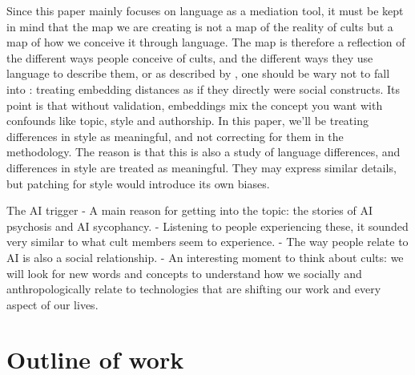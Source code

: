 Since this paper mainly focuses on language as a mediation tool, it must be kept in mind that the map we are creating is not a map of the reality of cults but a map of how we conceive it through language. The map is therefore a reflection of the different ways people conceive of cults, and the different ways they use language to describe them, or as described by \textcite{liProxyPresumptionSemantic2026}, one should be wary not to fall into : treating embedding distances as if they directly were social constructs. Its point is that without validation, embeddings mix the concept you want with confounds like topic, style and authorship. In this paper, we'll be treating differences in style as meaningful, and not correcting for them in the methodology. The reason is that this is also a study of language differences, and differences in style are treated as meaningful. They may express similar details, but patching for style would introduce its own biases.

The AI trigger
- A main reason for getting into the topic: the stories of AI psychosis and AI sycophancy.
- Listening to people experiencing these, it sounded very similar to what cult members seem to experience.
- The way people relate to AI is also a social relationship.
- An interesting moment to think about cults: we will look for new words and concepts to understand how we socially and anthropologically relate to technologies that are shifting our work and every aspect of our lives.

\section{Outline of work}
\label{sec:outline}
